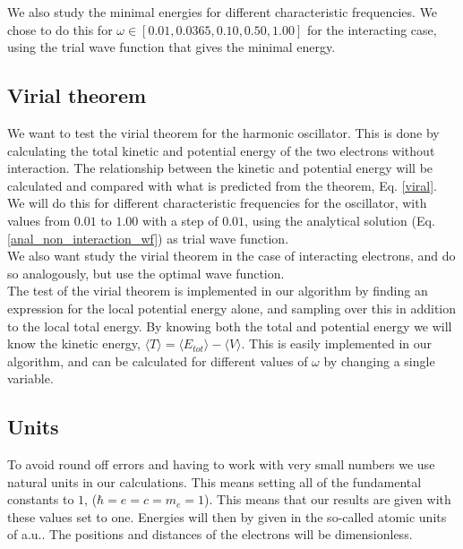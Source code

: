 \documentclass[%
 reprint,
nofootinbib,
aps,
]{revtex4-1}
\begin{document}
We also study the minimal energies for different characteristic frequencies. We chose to do this for $\omega \in [0.01, 0.0365, 0.10, 0.50, 1.00]$ for the interacting case, using the trial wave function that gives the minimal energy.

\subsection{Virial theorem}
We want to test the virial theorem for the harmonic oscillator. This is done by calculating the total kinetic and potential energy of the two electrons without interaction. The relationship between the kinetic and potential energy will be calculated and compared with what is predicted from the theorem, Eq. \eqref{viral}. We will do this for different characteristic frequencies for the oscillator, with values from $0.01$ to $1.00$ with a step of $0.01$, using the analytical solution (Eq. \eqref{anal_non_interaction_wf}) as trial wave function.\\
We also want study the virial theorem in the case of interacting electrons, and do so analogously, but use the optimal wave function.\\
The test of the virial theorem is implemented in our algorithm by finding an expression for the local potential energy alone, and sampling over this in addition to the local total energy. By knowing both the total and potential energy we will know the kinetic energy, $\langle T \rangle = \langle E_{tot} \rangle - \langle V \rangle$. This is easily implemented in our algorithm, and can be calculated for different values of $\omega$ by changing a single variable.

\subsection{Units}
To avoid round off errors and having to work with very small numbers we use natural units in our calculations. This means setting all of the fundamental constants to $1$, ($\hbar = e = c = m_e = 1$). This means that our results are given with these values set to one. Energies will then by given in the so-called atomic units of a.u.. The positions and distances of the electrons will be dimensionless.

\end{document}
